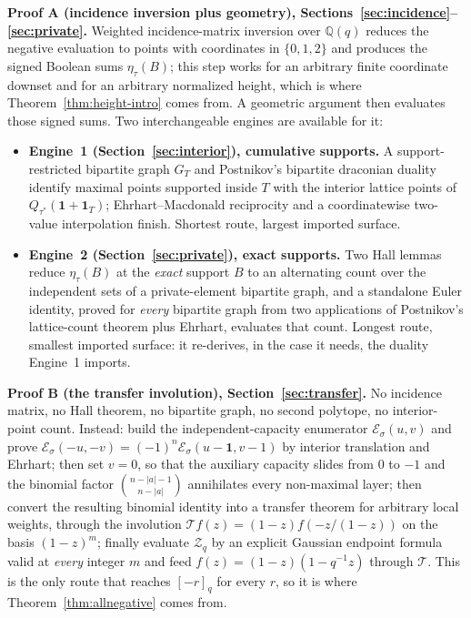\documentclass[11pt]{article}
\numberwithin{equation}{section}
\theoremstyle{definition}
\theoremstyle{remark}
\newcommand{\Q}{\mathbb Q}
\newcommand{\one}{\mathbf 1}
\newcommand{\Ecal}{\mathcal E}
\newcommand{\Tr}{\mathcal T}
\newcommand{\qint}[1]{[#1]_q}
\newcommand{\Zeta}{\mathcal Z}
\begin{document}
\medskip\noindent\textbf{Proof A (incidence inversion plus geometry),
Sections~\ref{sec:incidence}--\ref{sec:private}.} Weighted incidence-matrix
inversion over $\Q(q)$ reduces the negative evaluation to points with
coordinates in $\{0,1,2\}$ and produces the signed Boolean sums
$\eta_\tau(B)$; this step works for an arbitrary finite coordinate downset and
for an arbitrary normalized height, which is where
Theorem~\ref{thm:height-intro} comes from. A geometric argument then evaluates
those signed sums. Two interchangeable engines are available for it:
\begin{itemize}
\item \textbf{Engine~1 (Section~\ref{sec:interior}), cumulative supports.}
 A support-restricted bipartite graph $G_T$ and Postnikov's bipartite
 draconian duality identify maximal points supported inside $T$ with the
 interior lattice points of $Q_{\tau^*}(\one+\one_T)$; Ehrhart--Macdonald
 reciprocity and a coordinatewise two-value interpolation finish. Shortest
 route, largest imported surface.
\item \textbf{Engine~2 (Section~\ref{sec:private}), exact supports.}
 Two Hall lemmas reduce $\eta_\tau(B)$ at the \emph{exact} support $B$ to an
 alternating count over the independent sets of a private-element bipartite
 graph, and a standalone Euler identity, proved for \emph{every} bipartite
 graph from two applications of Postnikov's lattice-count theorem plus
 Ehrhart, evaluates that count. Longest route, smallest imported surface: it
 re-derives, in the case it needs, the duality Engine~1 imports.
\end{itemize}

\medskip\noindent\textbf{Proof B (the transfer involution),
Section~\ref{sec:transfer}.} No incidence matrix, no Hall theorem, no
bipartite graph, no second polytope, no interior-point count. Instead: build
the independent-capacity enumerator $\Ecal_\sigma(u,v)$ and prove
$\Ecal_\sigma(-u,-v)=(-1)^n\Ecal_\sigma(u-\one,v-1)$ by interior translation
and Ehrhart; then set $v=0$, so that the auxiliary capacity slides from $0$ to
$-1$ and the binomial factor $\binom{n-|a|-1}{n-|a|}$ annihilates every
non-maximal layer; then convert the resulting binomial identity into a
transfer theorem for arbitrary local weights, through the involution
$\Tr f(z)=(1-z)f(-z/(1-z))$ on the basis $(1-z)^m$; finally evaluate
$\Zeta_q$ by an explicit Gaussian endpoint formula valid at \emph{every}
integer $m$ and feed $f(z)=(1-z)(1-q^{-1}z)$ through $\Tr$. This is the only
route that reaches $\qint{-r}$ for every $r$, so it is where
Theorem~\ref{thm:allnegative} comes from.
\end{document}
